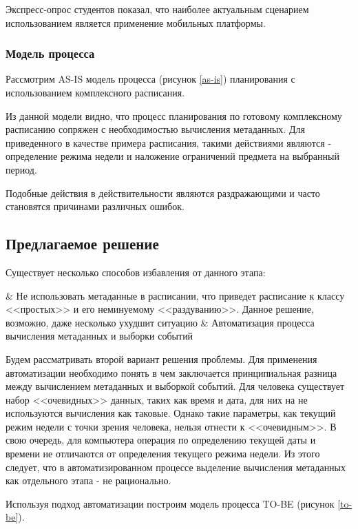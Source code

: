 Экспресс-опрос студентов показал, что наиболее актуальным сценарием использованием является применение мобильных платформы.

\subsubsection{Модель процесса}

Рассмотрим AS-IS модель процесса (рисунок \ref{as-is}) планирования с использованием комплексного расписания.


Из данной модели видно, что процесс планирования по готовому комплексному расписанию сопряжен с необходимостью вычисления метаданных.
Для приведенного в качестве примера расписания, такими действиями являются - определение режима недели и наложение ограничений предмета на выбранный период.

Подобные действия в действительности являются раздражающими и часто становятся причинами различных ошибок.

\subsection{Предлагаемое решение}

Существует несколько способов избавления от данного этапа:
\begin{easylist}
  & Не использовать метаданные в расписании, что приведет расписание к классу <<простых>> и его неминуемому <<раздуванию>>. Данное решение, возможно, даже несколько ухудшит ситуацию
  & Автоматизация процесса вычисления метаданных и выборки событий
\end{easylist}

Будем рассматривать второй вариант решения проблемы.
Для применения автоматизации необходимо понять в чем заключается принципиальная разница между вычислением метаданных и выборкой событий.
Для человека существует набор <<очевидных>> данных, таких как время и дата, для них на не используются вычисления как таковые.
Однако такие параметры, как текущий режим недели с точки зрения человека, нельзя отнести к <<очевидным>>.
В свою очередь, для компьютера операция по определению текущей даты и времени не отличаются от определения текущего режима недели.
Из этого следует, что в автоматизированном процессе выделение вычисления метаданных как отдельного этапа - не рационально.

Используя подход автоматизации построим модель процесса TO-BE (рисунок \ref{to-be}).

